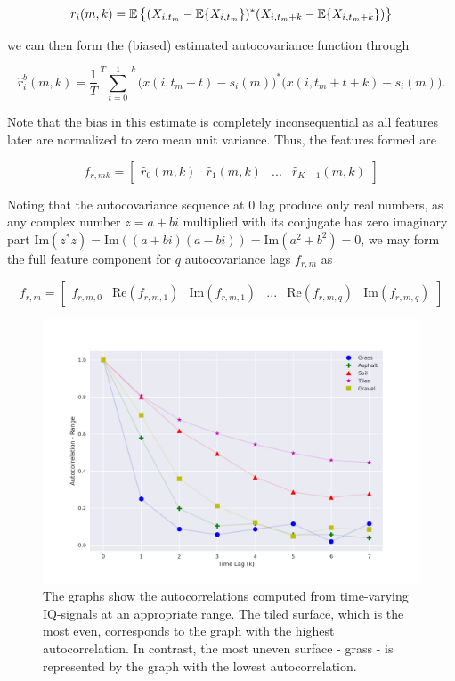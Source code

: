 \begin{equation}
	r_i(m, k) = \operatorname*{\mathbb{E}}\big\{(X_{i,t_m} - \operatorname*{\mathbb{E}}\{X_{i,t_m}\})^*(X_{i,t_m+k} - \operatorname*{\mathbb{E}}\{X_{i,t_m+k}\})\big\}
\end{equation}

we can then form the (biased) estimated autocovariance function through

\begin{equation}
	\hat{r}_i^b(m, k) = \frac{1}{T}\sum_{t=0}^{T-1-k}\big(x(i,t_m+t) - s_i(m)\big)^*\big(x(i,t_m+t+k) - s_i(m)\big).
\end{equation}


Note that the bias in this estimate is completely inconsequential as all features later are normalized to zero mean unit variance.  Thus, the features formed are

\begin{equation}
	f_{r,mk} = 
	\begin{bmatrix}
		\hat{r}_0(m,k) & \hat{r}_1(m,k) & ... & \hat{r}_{K-1}(m,k)
	\end{bmatrix}
\end{equation}

Noting that the autocovariance sequence at 0 lag produce only real numbers, as any complex number $z = a + bi$ multiplied with its conjugate has zero imaginary part $\text{Im}(z^*z) = \text{Im}((a + bi)(a - bi)) = \text{Im}(a^2 + b^2) = 0$, we may form the full feature component for $q$ autocovariance lags $f_{r,m}$ as

\begin{equation}
	f_{r,m} = 
	\begin{bmatrix}
		f_{r,m,0} & \text{Re}(f_{r,m,1}) & \text{Im}(f_{r,m,1}) & ... & \text{Re}(f_{r,m,q}) & \text{Im}(f_{r,m,q}) 
	\end{bmatrix}
\end{equation}

\begin{figure}[h]
	\centering
	\includegraphics[scale=0.45]{figs_temp/features/autocorr_range.png}
	\caption{The graphs show the autocorrelations computed from time-varying IQ-signals at an appropriate range. The tiled surface, which is the most even, corresponds to the graph with the highest autocorrelation. In contrast, the most uneven surface - grass - is represented by the graph with the lowest autocorrelation.}
	\label{fig:autocorr_range}
\end{figure}


